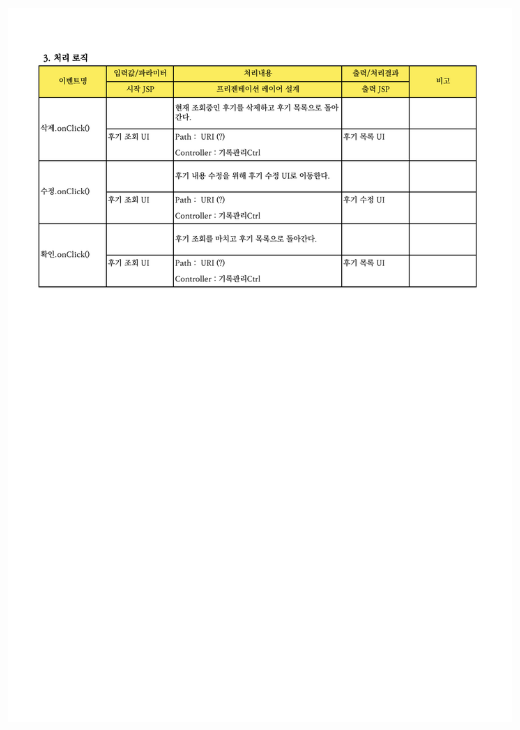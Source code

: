 {{{{{{{{{{{{{{{{{{{{{{{{{{{{{{{{{{{{{{{{{{{{{{{{{{{{{{{{{{{{{{{{{{{{{{{{{\includegraphics[width=20cm]{./Figure/Design/Display/review/review_04.pdf} \\
}}}}}}}}}}}}}}}}}}}}}}}}}}}}}}}}}}}}}}}}}}}}}}}}}}}}}}}}}}}}}}}}}}}}}}}}}
